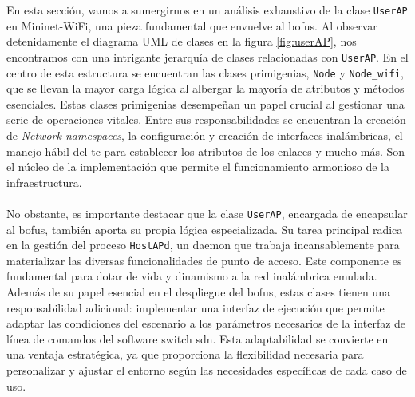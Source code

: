 En esta sección, vamos a sumergirnos en un análisis exhaustivo de la clase \texttt{UserAP} en Mininet-WiFi, una pieza fundamental que envuelve al \gls{bofus}. Al observar detenidamente el diagrama UML de clases en la figura \ref{fig:userAP}, nos encontramos con una intrigante jerarquía de clases relacionadas con \texttt{UserAP}. En el centro de esta estructura se encuentran las clases primigenias, \texttt{Node} y \texttt{Node_wifi}, que se llevan la mayor carga lógica al albergar la mayoría de atributos y métodos esenciales. Estas clases primigenias desempeñan un papel crucial al gestionar una serie de operaciones vitales. Entre sus responsabilidades se encuentran la creación de \textit{Network namespaces}, la configuración y creación de interfaces inalámbricas, el manejo hábil del \gls{tc} para establecer los atributos de los enlaces y mucho más. Son el núcleo de la implementación que permite el funcionamiento armonioso de la infraestructura.\\
\\
No obstante, es importante destacar que la clase \texttt{UserAP}, encargada de encapsular al \gls{bofus}, también aporta su propia lógica especializada. Su tarea principal radica en la gestión del proceso \texttt{HostAPd}, un daemon que trabaja incansablemente para materializar las diversas funcionalidades de punto de acceso. Este componente es fundamental para dotar de vida y dinamismo a la red inalámbrica emulada. Además de su papel esencial en el despliegue del \gls{bofus}, estas clases tienen una responsabilidad adicional: implementar una interfaz de ejecución que permite adaptar las condiciones del escenario a los parámetros necesarios de la interfaz de línea de comandos del software switch \gls{sdn}. Esta adaptabilidad se convierte en una ventaja estratégica, ya que proporciona la flexibilidad necesaria para personalizar y ajustar el entorno según las necesidades específicas de cada caso de uso.
